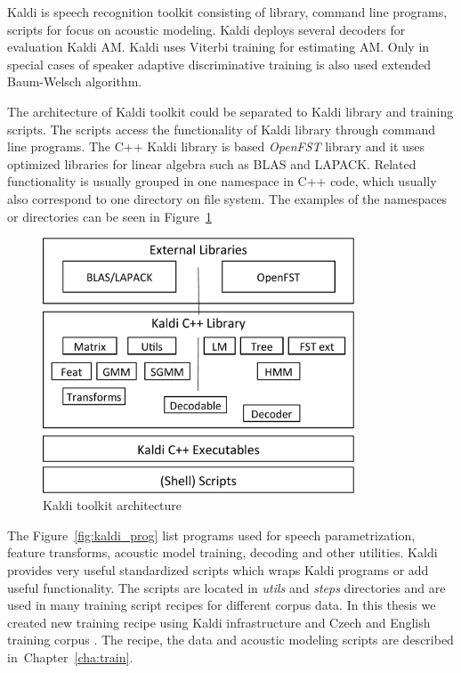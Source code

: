 Kaldi is speech recognition toolkit consisting of library, command line programs, scripts for focus on acoustic modeling.
Kaldi deploys several decoders for evaluation Kaldi \ac{AM}.
Kaldi uses Viterbi training for estimating \ac{AM}. 
Only in special cases of speaker adaptive discriminative training is also used extended Baum-Welsch algorithm\cite{povey2011kaldi}.

The architecture of Kaldi toolkit could be separated to Kaldi library and training scripts.
The scripts access the functionality of Kaldi library through command line programs.
The C++ Kaldi library is based {\it OpenFST}\cite{allauzen2007openfst} library and 
it uses optimized libraries for linear algebra such as BLAS and LAPACK.
Related functionality is usually grouped in one namespace in C++ code, which usually also correspond
to one directory on file system. The examples of the namespaces or directories can be seen in Figure~\ref{fig:kaldi_arch}

\begin{figure}[!htp]
    \begin{center}
        \includegraphics[width=25em]{images/kaldi-lib}
        \caption{Kaldi toolkit architecture\cite{povey2011kaldi}}
        \label{fig:kaldi_arch} 
    \end{center}
\end{figure}

The Figure~\ref{fig:kaldi_prog} list programs used for speech parametrization, feature transforms, acoustic model
training, decoding and other utilities. Kaldi provides very useful standardized scripts which wraps
Kaldi programs or add useful functionality. The scripts are located in {\it utils} and {\it steps}
directories and are used in many training script recipes for different corpus data.
In this thesis we created new training recipe using Kaldi infrastructure and
Czech and English training corpus \cite{korvas_2014}.
The recipe, the data and acoustic modeling scripts are described in~Chapter~\ref{cha:train}.

